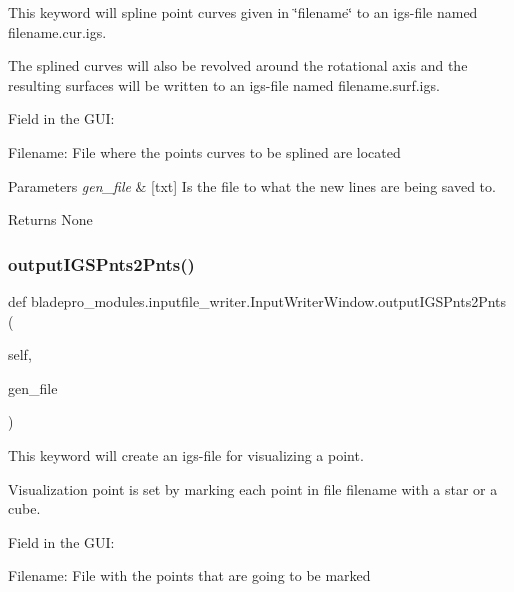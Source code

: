 This keyword will spline point curves given in \char`\"{}filename\char`\"{} to an igs-\/file named filename.\+cur.\+igs. 

The splined curves will also be revolved around the rotational axis and the resulting surfaces will be written to an igs-\/file named filename.\+surf.\+igs.

Field in the G\+UI\+: \begin{DoxyItemize}
\item {\ttfamily Filename\+:} File where the points curves to be splined are located\end{DoxyItemize}

\begin{DoxyParams}{Parameters}
{\em gen\+\_\+file} & \mbox{[}txt\mbox{]} Is the file to what the new lines are being saved to. \\
\hline
\end{DoxyParams}
\begin{DoxyReturn}{Returns}
None 
\end{DoxyReturn}
\hypertarget{a00071_a07862d0aa6332b54008342a24c2e30a3}{}\label{a00071_a07862d0aa6332b54008342a24c2e30a3} 
\subsubsection{\texorpdfstring{output\+I\+G\+S\+Pnts2\+Pnts()}{outputIGSPnts2Pnts()}}
{\footnotesize\ttfamily def bladepro\+\_\+modules.\+inputfile\+\_\+writer.\+Input\+Writer\+Window.\+output\+I\+G\+S\+Pnts2\+Pnts (\begin{DoxyParamCaption}\item[{}]{self,  }\item[{}]{gen\+\_\+file }\end{DoxyParamCaption})}



This keyword will create an igs-\/file for visualizing a point. 

Visualization point is set by marking each point in file filename with a star or a cube.

Field in the G\+UI\+: \begin{DoxyItemize}
\item {\ttfamily Filename\+:} File with the points that are going to be marked\end{DoxyItemize}

